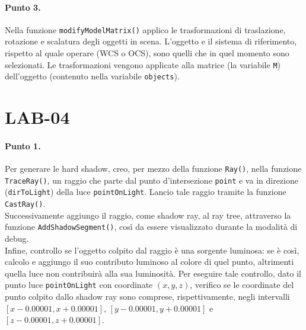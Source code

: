 \documentclass[a4paper, 12pt]{article}
\begin{document}
\paragraph{Punto 3.}
Nella funzione \texttt{modifyModelMatrix()} applico le trasformazioni di traslazione, rotazione e scalatura degli oggetti in scena. L'oggetto e il sistema di riferimento, rispetto al quale operare (WCS o OCS), sono quelli che in quel momento sono selezionati. Le trasformazioni vengono applicate alla matrice (la variabile \texttt{M}) dell'oggetto (contenuto nella variabile \texttt{objects}).


\section{LAB-04}

\paragraph{Punto 1.}
Per generare le hard shadow, creo, per mezzo della funzione \texttt{Ray()}, nella funzione \texttt{TraceRay()}, un raggio che parte dal punto d'intersezione \texttt{point} e va in direzione (\texttt{dirToLight}) della luce \texttt{pointOnLight}. Lancio tale raggio tramite la funzione \texttt{CastRay()}.\\
Successivamente aggiungo il raggio, come shadow ray, al ray tree, attraverso la funzione \texttt{AddShadowSegment()}, così da essere visualizzato durante la modalità di debug.\\
Infine, controllo se l'oggetto colpito dal raggio è una sorgente luminosa: se è così, calcolo e aggiungo il suo contributo luminoso al colore di quel punto, altrimenti quella luce non contribuirà alla sua luminosità. Per eseguire tale controllo, dato il punto luce \texttt{pointOnLight} con coordinate $(x, y, z)$, verifico se le coordinate del punto colpito dallo shadow ray sono comprese, rispettivamente, negli intervalli $[x - 0.00001, x + 0.00001]$, $[y - 0.00001, y + 0.00001]$ e $[z - 0.00001, z + 0.00001]$.
\end{document}
